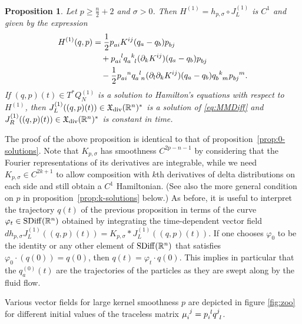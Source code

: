 \documentclass[12pt]{amsart}
\newcommand{\R}{\ensuremath{\mathbb{R}}}
\newtheorem{prop}[thm]{Proposition}
\begin{document}
  \begin{prop} \label{prop:1-solutions}
    Let $p \ge \frac{n}{2} + 2$ and $\sigma > 0$.
    Then $H^{(1)} = h_{p,\sigma} \circ J_L^{(1)}$ is $C^1$ and given by the expression
	\begin{align*}
		H^{(1)}(q,p) &= \frac{1}{2} p\indices{_a_i} K^{ij}(q_a - q_b) p\indices{_b_j}\\
			&\quad + p\indices{_a_i^l} q\indices{_a^k_l} (\partial_k K^{ij})(q_a - q_b) p\indices{_b_j} \\
			&\quad -  \frac{1}{2} p\indices{_a_i^n} q\indices{_a^l_n} (\partial_l \partial_k K^{ij})(q_a - q_b) q\indices{_b^k_m} p\indices{_b_j^m}.
  \end{align*}
  If $(q,p)(t) \in T^*Q_N^{(1)}$ is a solution to Hamilton's equations with respect to
	$H^{(1)}$, then $J_L^{(1)}( (q,p)(t)) \in \mathfrak{X}_{\rm div}(\R^n)^*$ is
	a solution of \eqref{eq:MMDiff} and $J_R^{(1)}( (q,p)(t)) \in \mathfrak{X}_{\rm div}(\R^n)^*$ is
	constant in time. 
  \end{prop}
  The proof of the above proposition is identical to that of
  proposition~\ref{prop:0-solutions}. Note that $K_{p,\sigma}$ has
  smoothness $C^{2p-n-1}$ by considering that the Fourier
  representations of its derivatives are integrable, while we need
  $K_{p,\sigma} \in C^{2k+1}$ to allow composition with $k$th
  derivatives of delta distributions on each side and still obtain a
  $C^1$ Hamiltonian. (See also the more general condition on $p$ in
  proposition~\ref{prop:k-solutions} below.)
  As before, it is useful to interpret the trajectory $q(t)$ of the previous proposition in terms of the curve $\varphi_t \in  {\rm SDiff}(\mathbb{R}^n)$ obtained by integrating the time-dependent vector field $dh_{p, \sigma} J_L^{(1)}((q, p)(t)) = K_{p, \sigma} * J_L^{(1)}((q, p)(t))$. If one chooses $\varphi_0$ to be the identity or  any other element of ${\rm SDiff}(\mathbb{R}^n)$ that satisfies $\varphi_0 \cdot (q(0)) = q(0)$, then  $q(t) = \varphi_t \cdot  q(0)$. This implies in particular that the $q_a^{(0)}(t)$ are the trajectories of the particles as they are swept along by the fluid flow.

  Various vector fields for large kernel smoothness $p$
  are depicted in figure \ref{fig:zoo}
  for different initial values of the traceless matrix
  $\mu\indices{_i^j} = p\indices{_i^l} q\indices{^j_l}$.
\end{document}
